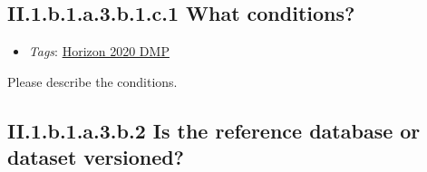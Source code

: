\documentclass[a4paper,12pt]{report}
\begin{document}
\subsection*{\protect\textcolor{colorSecId}{II.1.b.1.a.3.b.1.c.1} What conditions?}

\label{82fd0cce-2b41-423f-92ad-636d0872045c.efc80cc8-8318-4f8c-acb7-dc1c60e491c1.2663b978-5125-4224-9930-0a50dbe895c9.fcc51962-08df-4f4c-85ad-6bb932107010.0b1610c4-5030-43a3-8a6c-c69693351a79.58401091-2d48-4231-983a-c972d11d9f6e.8a1937d8-39dc-4efd-a3f6-b62e789f225b.aee03da5-b399-4274-8db4-fac82c6210d3.85dcd5ee-002b-4db7-a0de-241a4b2f0688.dce3e924-717a-4b50-bdac-1b247e9ac18a}


\begin{itemize}
  \item \textit{Tags}: \ul{Horizon 2020 DMP}
  \end{itemize}


\noindent
\begin{markdown}
Please describe the conditions.
\end{markdown}



\subsection*{\protect\textcolor{colorSecId}{II.1.b.1.a.3.b.2} Is the reference database or dataset versioned?}

\label{82fd0cce-2b41-423f-92ad-636d0872045c.efc80cc8-8318-4f8c-acb7-dc1c60e491c1.2663b978-5125-4224-9930-0a50dbe895c9.fcc51962-08df-4f4c-85ad-6bb932107010.0b1610c4-5030-43a3-8a6c-c69693351a79.58401091-2d48-4231-983a-c972d11d9f6e.8a1937d8-39dc-4efd-a3f6-b62e789f225b.10b6548c-21cd-44c8-a8de-47415e7b012e}
\end{document}
